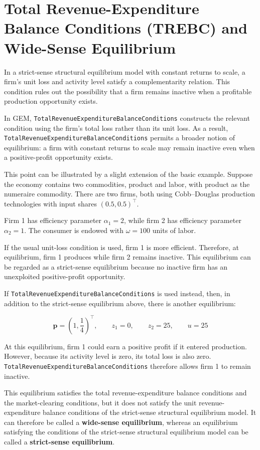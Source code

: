 \documentclass[
  letterpaper,
  DIV=11,
  numbers=noendperiod]{scrreprt}
\begin{document}
\section{Total Revenue-Expenditure Balance Conditions (TREBC) and
Wide-Sense
Equilibrium}\label{total-revenue-expenditure-balance-conditions-trebc-and-wide-sense-equilibrium}

In a strict-sense structural equilibrium model with constant returns to
scale, a firm's unit loss and activity level satisfy a complementarity
relation. This condition rules out the possibility that a firm remains
inactive when a profitable production opportunity exists.

In GEM, \texttt{TotalRevenueExpenditureBalanceConditions} constructs the
relevant condition using the firm's total loss rather than its unit
loss. As a result, \texttt{TotalRevenueExpenditureBalanceConditions}
permits a broader notion of equilibrium: a firm with constant returns to
scale may remain inactive even when a positive-profit opportunity
exists.

This point can be illustrated by a slight extension of the basic
example. Suppose the economy contains two commodities, product and
labor, with product as the numeraire commodity. There are two firms,
both using Cobb--Douglas production technologies with input shares
\((0.5,0.5)^\top\).

Firm 1 has efficiency parameter \(\alpha_1=2\), while firm 2 has
efficiency parameter \(\alpha_2=1\). The consumer is endowed with
\(\omega=100\) units of labor.

If the usual unit-loss condition is used, firm 1 is more efficient.
Therefore, at equilibrium, firm 1 produces while firm 2 remains
inactive. This equilibrium can be regarded as a strict-sense equilibrium
because no inactive firm has an unexploited positive-profit opportunity.

If \texttt{TotalRevenueExpenditureBalanceConditions} is used instead,
then, in addition to the strict-sense equilibrium above, there is
another equilibrium:

\[
\mathbf p=\left(1,\frac14\right)^\top,\qquad
z_1=0,\qquad
z_2=25, \qquad
u=25
\]

At this equilibrium, firm 1 could earn a positive profit if it entered
production. However, because its activity level is zero, its total loss
is also zero. \texttt{TotalRevenueExpenditureBalanceConditions}
therefore allows firm 1 to remain inactive.

This equilibrium satisfies the total revenue-expenditure balance
conditions and the market-clearing conditions, but it does not satisfy
the unit revenue-expenditure balance conditions of the strict-sense
structural equilibrium model. It can therefore be called a
\textbf{wide-sense equilibrium}, whereas an equilibrium satisfying the
conditions of the strict-sense structural equilibrium model can be
called a \textbf{strict-sense equilibrium}.
\end{document}
